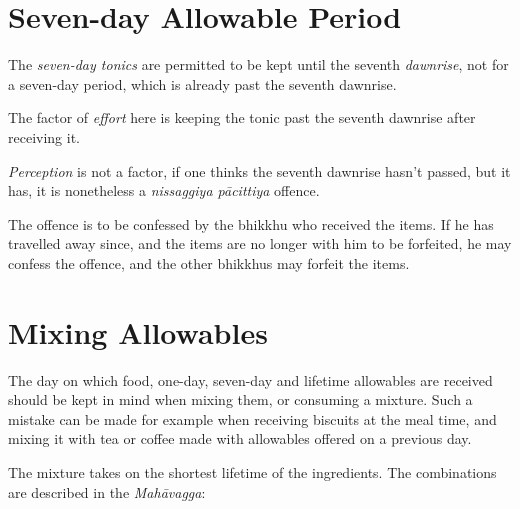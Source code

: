 \section*{Seven-day Allowable Period}

The \emph{seven-day tonics} are permitted to be kept until the seventh
\emph{dawnrise}, not for a seven-day period, which is already past the seventh
dawnrise.

The factor of \emph{effort} here is keeping the tonic past the seventh dawnrise
after receiving it.

\emph{Perception} is not a factor, if one thinks the seventh dawnrise hasn't
passed, but it has, it is nonetheless a \emph{nissaggiya pācittiya} offence.

The offence is to be confessed by the bhikkhu who received the items. If he has
travelled away since, and the items are no longer with him to be forfeited, he
may confess the offence, and the other bhikkhus may forfeit the items.

\section*{Mixing Allowables}

The day on which food, one-day, seven-day and lifetime allowables are received
should be kept in mind when mixing them, or consuming a mixture. Such a mistake
can be made for example when receiving biscuits at the meal time, and mixing it
with tea or coffee made with allowables offered on a previous day.

The mixture takes on the shortest lifetime of the ingredients. 
The combinations are described in the \emph{Mahāvagga}:

\ifhandbookedition
\clearpage
\fi

